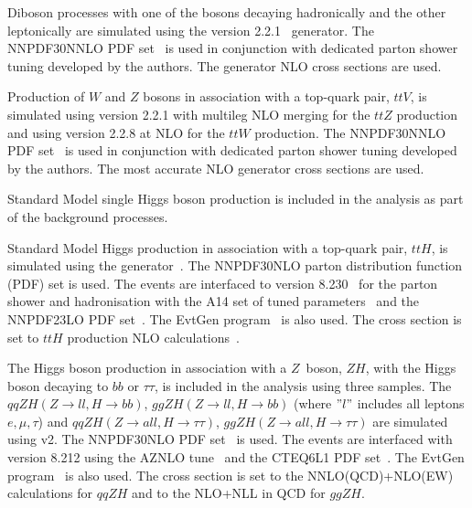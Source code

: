 Diboson processes with one of the bosons decaying hadronically and the other leptonically are simulated using the \SHERPA version 2.2.1~\cite{Bothmann:2019yzt} generator. The NNPDF30NNLO PDF set~\cite{NNPDF} is used in conjunction with dedicated parton shower tuning developed by the \SHERPA authors. The generator NLO cross sections are used.

Production of $W$ and $Z$ bosons in association with a top-quark pair, $ttV$, is simulated using \SHERPA version 2.2.1 with multileg NLO merging for the $ttZ$ production and using \SHERPA version 2.2.8 at NLO for the $ttW$ production. The NNPDF30NNLO PDF set~\cite{NNPDF} is used in conjunction with dedicated parton shower tuning developed by the \SHERPA authors. The most accurate NLO generator cross sections are used.

Standard Model single Higgs boson production is included in the analysis as part of the background processes. 

Standard Model Higgs production in association with a top-quark pair, $ttH$, is simulated using the \POWHEGBOX generator~\cite{Powheg1, Powheg2, Powheg3}. The NNPDF30NLO parton distribution function (PDF) set is used. The events are interfaced to  version  8.230~\cite{PYTHIA82} for the parton shower and hadronisation with the A14 set of tuned parameters~\cite{A14tune, ATLAS:2012uec} and the NNPDF23LO PDF set~\cite{NNPDF23PDFSet}. The EvtGen program~\cite{EvtGen} is also used. The cross section is set to $ttH$ production NLO calculations~\cite{Hxsec}.

The Higgs boson production in association with a $Z$\ boson, $ZH$, with the Higgs boson decaying to $bb$ or $\tau\tau$, is included in the analysis using three samples. The $qq ZH(Z\rightarrow ll, H\rightarrow bb)$, $gg ZH(Z\rightarrow ll,H\rightarrow bb)$ (where $"l"$ includes all leptons $e,\mu,\tau$) and $qq ZH(Z\rightarrow all, H\rightarrow \tau\tau)$, $gg ZH(Z\rightarrow all, H\rightarrow \tau\tau)$ are simulated using \POWHEGBOX v2. The NNPDF30NLO PDF set~\cite{NNPDF} is used. The events are interfaced with  version 8.212 using the AZNLO tune~\cite{AZNLOtune} and the CTEQ6L1 PDF set~\cite{CTEQ6L1}. The EvtGen program~\cite{EvtGen} is also used. The cross section is set to the NNLO(QCD)+NLO(EW) calculations for $qqZH$ and to the NLO+NLL in QCD for $ggZH$. %

